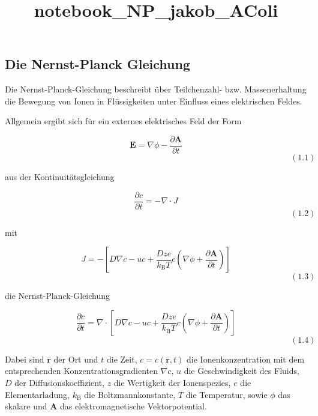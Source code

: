 \documentclass[11pt]{article}
\title{notebook\_NP\_jakob\_AColi}
\begin{document}
    
    
    \maketitle
    
    

    
    \subsection{Die Nernst-Planck
Gleichung}\label{die-nernst-planck-gleichung}

    Die Nernst-Planck-Gleichung beschreibt über Teilchenzahl- bzw.
Massenerhaltung die Bewegung von Ionen in Flüssigkeiten unter Einfluss
eines elektrischen Feldes.

    Allgemein ergibt sich für ein externes elektrisches Feld der Form

\[ \mathbf{E} = \nabla \phi − \frac{\partial{\mathbf{A}}}{\partial{t}}\]
\[\qquad\qquad\qquad\qquad\qquad\qquad\qquad\qquad\qquad\qquad\qquad\qquad\qquad\qquad\qquad\qquad\qquad(1.1)\]

aus der Kontinuitätsgleichung

\[\frac{\partial c}{\partial t} = - \nabla \cdot J\]
\[\qquad\qquad\qquad\qquad\qquad\qquad\qquad\qquad\qquad\qquad\qquad\qquad\qquad\qquad\qquad\qquad\qquad(1.2)\]

mit

\[ J = - \left[D  \nabla c - u c + \frac{Dze}{k_\mathrm{B} T} c \left(\nabla \phi+\frac{\partial \mathbf A}{\partial t} \right) \right]\]
\[\qquad\qquad\qquad\qquad\qquad\qquad\qquad\qquad\qquad\qquad\qquad\qquad\qquad\qquad\qquad\qquad\qquad(1.3)\]

die Nernst-Planck-Gleichung

\[\frac{\partial c}{\partial t} = \nabla \cdot \left[ D \nabla c - u c + \frac{Dze}{k_\mathrm{B} T} c \left(\nabla \phi+\frac{\partial \mathbf A}{\partial t} \right) \right] \]
\[\qquad\qquad\qquad\qquad\qquad\qquad\qquad\qquad\qquad\qquad\qquad\qquad\qquad\qquad\qquad\qquad\qquad(1.4)\]

    Dabei sind \(\mathbf{r}\) der Ort und \(t\) die Zeit,
\(c = c(\mathbf{r}, t)\) die Ionenkonzentration mit dem entsprechenden
Konzentrationsgradienten \(\nabla c\), \(u\) die Geschwindigkeit des
Fluids, \(D\) der Diffusionskoeffizient, \(z\) die Wertigkeit der
Ionenspezies, \(e\) die Elementarladung, \(k_\mathrm{B}\) die
Boltzmannkonstante, \(T\) die Temperatur, sowie \(\phi\) das skalare und
\(\mathbf{A}\) das elektromagnetische Vektorpotential.
\end{document}
